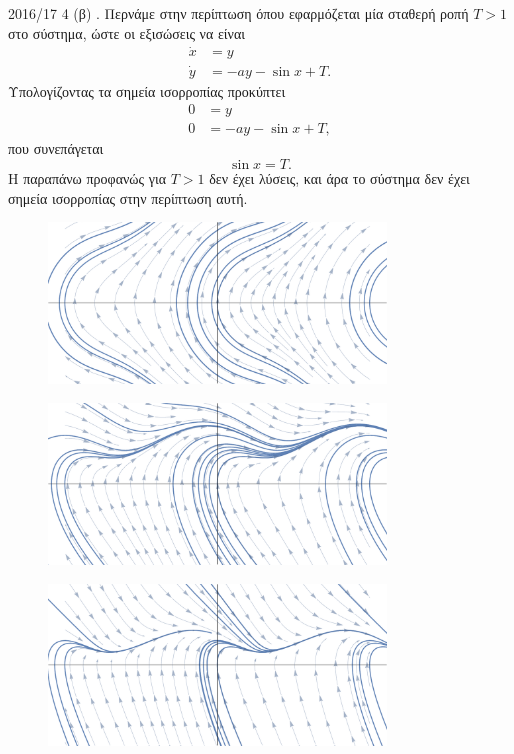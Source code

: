 \begin{solution}{2016/17 4}
    (β) . Περνάμε στην περίπτωση όπου εφαρμόζεται μία σταθερή ροπή
    \( T > 1\) στο σύστημα, ώστε οι εξισώσεις να είναι
    \begin{align*}
        \dot{x} &= y \\
        \dot{y} &= -a y - \sin{x} + T.
    \end{align*}
    Υπολογίζοντας τα σημεία ισορροπίας προκύπτει
    \begin{align*}
        0 &= y \\
        0 &= -a y - \sin{x} + T,
    \end{align*}
    που συνεπάγεται
    \[
        \sin{x} = T.
    \]
    Η παραπάνω προφανώς για \( T > 1 \) δεν έχει λύσεις, και άρα το σύστημα δεν
    έχει σημεία ισορροπίας στην περίπτωση αυτή.
    \begin{figure}[h!]
        \centering
        \includegraphics[width=0.8\textwidth]{figures/ex4_torque2Comb.pdf}
        \caption{}
        \label{fig:ex4_torque2Comb}
    \end{figure}
    \begin{figure}[h!]
        \centering
        \includegraphics[width=0.8\textwidth]{figures/ex4_torque2damped1Comb.pdf}
        \caption{}
        \label{fig:ex4_torque2damped1Comb}
    \end{figure}
    \begin{figure}[h!]
        \centering
        \includegraphics[width=0.8\textwidth]{figures/ex4_torque2damped2Comb.pdf}

\end{figure}
\end{solution}

